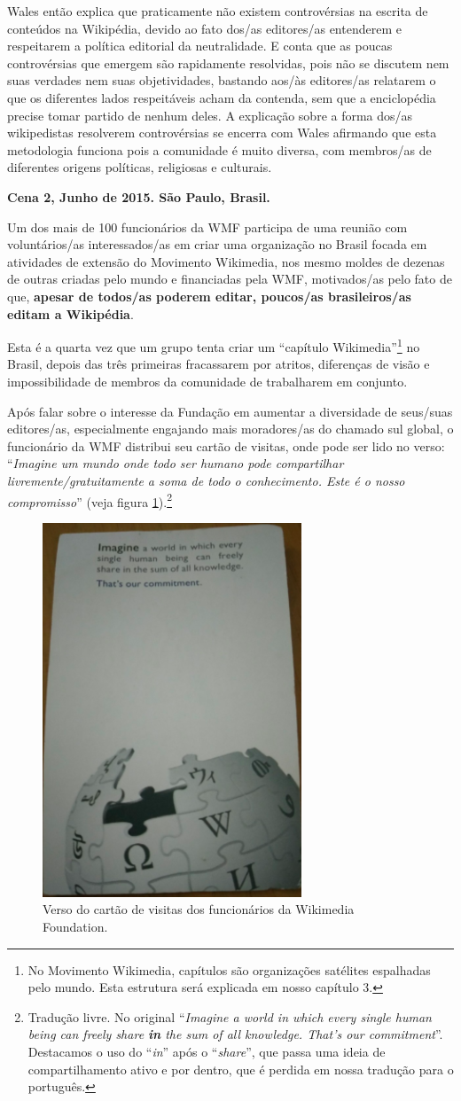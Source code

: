 Wales então explica que praticamente não existem controvérsias na escrita de conteúdos na Wikipédia, devido ao fato dos/as editores/as entenderem e respeitarem a política editorial da neutralidade. E conta que as poucas controvérsias que emergem são rapidamente resolvidas, pois não se discutem nem suas verdades  nem suas objetividades, bastando aos/às editores/as relatarem o que os diferentes lados respeitáveis acham da contenda, sem que a enciclopédia precise tomar partido de nenhum deles. A explicação sobre a forma dos/as wikipedistas resolverem controvérsias se encerra com Wales afirmando que esta metodologia funciona pois a comunidade é muito diversa, com membros/as de diferentes origens políticas, religiosas e culturais.

\textbf{Cena 2, Junho de 2015. São Paulo, Brasil.}

Um dos mais de 100 funcionários da WMF participa de uma reunião com voluntários/as interessados/as em criar uma organização no Brasil focada em atividades de extensão do Movimento Wikimedia, nos mesmo moldes de dezenas de outras criadas pelo mundo e financiadas pela WMF, motivados/as pelo fato de que, \textbf{apesar de todos/as poderem editar, poucos/as brasileiros/as editam a Wikipédia}.

Esta é a quarta vez que um grupo tenta criar um ``capítulo Wikimedia''\footnote{No Movimento Wikimedia, capítulos são organizações satélites espalhadas pelo mundo. Esta estrutura será explicada em nosso capítulo 3.} no Brasil, depois das três primeiras fracassarem por atritos, diferenças de visão e impossibilidade de membros da comunidade de trabalharem em conjunto.

Após falar sobre o interesse da Fundação em aumentar a diversidade de seus/suas editores/as, especialmente engajando mais moradores/as do chamado sul global, o funcionário da WMF distribui seu cartão de visitas, onde pode ser lido no verso: ``\textit{Imagine um mundo onde todo ser humano pode compartilhar  livremente/gratuitamente a soma de todo o conhecimento. Este é o nosso compromisso}'' (veja figura \ref{fig:cartao_wmf}).\footnote{Tradução livre. No original ``\textit{Imagine a world in which every single human being can freely share \textbf{in} the sum of all knowledge. That’s our commitment}''. Destacamos o uso do ``\textit{in}'' após o ``\textit{share}'', que passa uma ideia de compartilhamento ativo e por dentro, que é perdida em nossa tradução para o português.}

\begin{figure}[H]
    \centering
    \includegraphics[width=.4\textwidth]{Images/cartao_wmf.png}
    \caption{Verso do cartão de visitas dos funcionários da Wikimedia Foundation.}
    \label{fig:cartao_wmf}
\end{figure}

